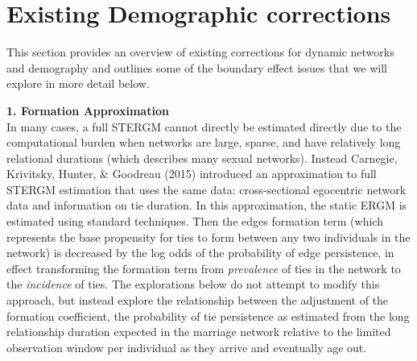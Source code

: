 \documentclass [11pt, proquest] {uwthesis}[2015/03/03]
\begin{document}
\hypertarget{existing-demographic-corrections}{%
\section{Existing Demographic corrections}\label{existing-demographic-corrections}}

This section provides an overview of existing corrections for dynamic networks and demography and outlines some of the boundary effect issues that we will explore in more detail below.

\textbf{1. Formation Approximation}\\
In many cases, a full STERGM cannot directly be estimated directly due to the computational burden when networks are large, sparse, and have relatively long relational durations (which describes many sexual networks). Instead Carnegie, Krivitsky, Hunter, \& Goodreau (2015) introduced an approximation to full STERGM estimation that uses the same data: cross-sectional egocentric network data and information on tie duration. In this approximation, the static ERGM is estimated using standard techniques. Then the edges formation term (which represents the base propensity for ties to form between any two individuals in the network) is decreased by the log odds of the probability of edge persistence, in effect transforming the formation term from \emph{prevalence} of ties in the network to the \emph{incidence} of ties. The explorations below do not attempt to modify this approach, but instead explore the relationship between the adjustment of the formation coefficient, the probability of tie persistence as estimated from the long relationship duration expected in the marriage network relative to the limited observation window per individual as they arrive and eventually age out.
\end{document}

